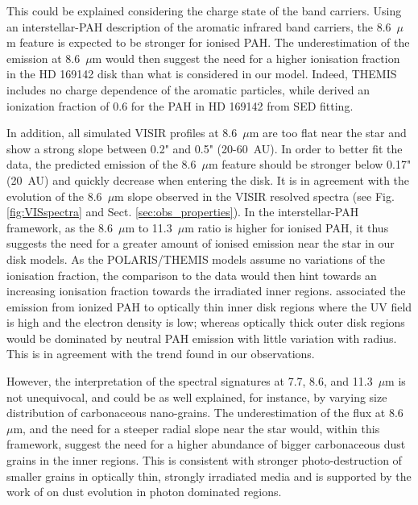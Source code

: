 \documentclass{aa}
\newcommand{\mic}{~$\mu$m\xspace}
\begin{document}
This could be explained considering the charge state of the band carriers. Using an interstellar-PAH description of the aromatic infrared band carriers, the 8.6\mic feature is expected to be stronger for ionised PAH. The underestimation of the emission at 8.6\mic would then suggest the need for a higher ionisation fraction in the HD 169142 disk than what is considered in our model. Indeed, THEMIS includes no charge dependence of the aromatic particles, while \citet{Seok_2016} derived an ionization fraction of 0.6 for the PAH in HD 169142 from SED fitting. 

In addition, all simulated VISIR profiles at 8.6\mic are too flat near the star and show a strong slope between 0.2" and 0.5" (20-60~AU). In order to better fit the data, the predicted emission of the 8.6\mic feature should be stronger below 0.17" (20~AU) and quickly decrease when entering the disk. It is in agreement with the evolution of the 8.6\mic slope observed in the VISIR resolved spectra (see Fig. \ref{fig:VISspectra} and Sect. \ref{sec:obs_properties}). In the interstellar-PAH framework, as the 8.6\mic to 11.3\mic ratio is higher for ionised PAH, it thus suggests the need for a greater amount of ionised emission near the star in our disk models. As the POLARIS/THEMIS models assume no variations of the ionisation fraction, the comparison to the data would then hint towards an increasing ionisation fraction towards the irradiated inner regions. \citet{Maaskant2014} associated the emission from ionized PAH to optically thin inner disk regions where the UV field is high and the electron density is low; whereas optically thick outer disk regions would be dominated by neutral PAH emission with little variation with radius. This is in agreement with the trend found in our observations. 

However, the interpretation of the spectral signatures at 7.7, 8.6, and 11.3\mic is not unequivocal, and could be as well explained, for instance, by varying size distribution of carbonaceous nano-grains. The underestimation of the flux at 8.6\mic, and the need for a steeper radial slope near the star would, within this framework, suggest the need for a higher abundance of bigger carbonaceous dust grains in the inner regions. This is consistent with stronger photo-destruction of smaller grains in optically thin, strongly irradiated media and is supported by the work of \citet{Schirmer2020, Schirmer2021} on dust evolution in photon dominated regions.
\end{document}
